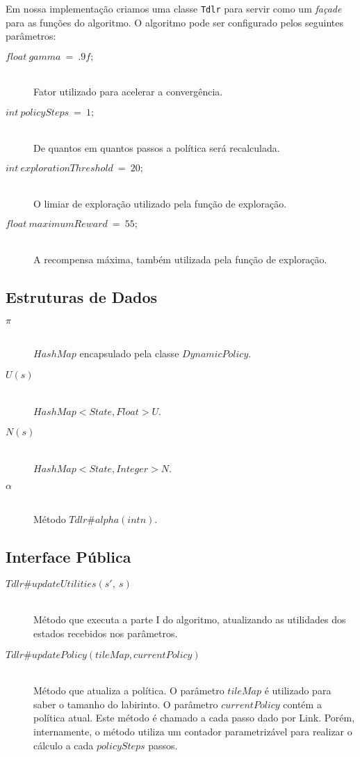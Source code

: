 \documentclass[letterpaper]{article}
\begin{document}
Em nossa implementação criamos uma classe \texttt{Tdlr} para servir como um \textit{façade} para
as funções do algoritmo. O algoritmo pode ser configurado pelos seguintes parâmetros:

\begin{description}
  \item[$float\ gamma\ =\ .9f;$] \hfill \\
  Fator utilizado para acelerar a convergência.
  \item[$int\ policySteps\ =\ 1;$] \hfill \\
  De quantos em quantos passos a política será recalculada.
  \item[$int\ explorationThreshold\ =\ 20;$] \hfill \\
  O limiar de exploração utilizado pela função de exploração.
  \item[$float\ maximumReward\ =\ 55;$] \hfill \\
  A recompensa máxima, também utilizada pela função de exploração.

\end{description}

\subsection{Estruturas de Dados}

\begin{description}
\item[$\pi$] \hfill \\ $HashMap$ encapsulado pela classe $DynamicPolicy$.
\item[$U(s)$] \hfill \\ $HashMap<State, Float> U$.
\item[$N(s)$] \hfill \\ $HashMap<State, Integer> N$.
\item[$\alpha$] \hfill \\ Método $Tdlr\#alpha(int n)$.
\end{description}

\subsection{Interface Pública}

\begin{description}
\item[$Tdlr\#updateUtilities(s\prime,\ s)$] \hfill\\
  Método que executa a parte I do algoritmo, atualizando as utilidades dos estados recebidos
  nos parâmetros.
\item[$Tdlr\#updatePolicy(tileMap, currentPolicy)$] \hfill\\
  Método que atualiza a política. O parâmetro $tileMap$ é utilizado para saber o tamanho do
  labirinto. O parâmetro $currentPolicy$ contém a política atual. Este método é chamado a cada
  passo dado por Link. Porém, internamente, o método utiliza um contador parametrizável para
  realizar o cálculo a cada $policySteps$ passos.
\end{description}
\end{document}
